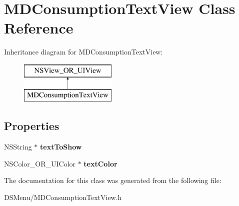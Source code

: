 \hypertarget{interface_m_d_consumption_text_view}{\section{M\-D\-Consumption\-Text\-View Class Reference}
\label{interface_m_d_consumption_text_view}
}
Inheritance diagram for M\-D\-Consumption\-Text\-View\-:\begin{figure}[H]
\begin{center}
\leavevmode
\includegraphics[height=2.000000cm]{interface_m_d_consumption_text_view}
\end{center}
\end{figure}
\subsection*{Properties}
\begin{DoxyCompactItemize}
\item 
\hypertarget{interface_m_d_consumption_text_view_a6add05e21d4bb0d81289fe1686aa8f38}{N\-S\-String $\ast$ {\bfseries text\-To\-Show}}\label{interface_m_d_consumption_text_view_a6add05e21d4bb0d81289fe1686aa8f38}

\item 
\hypertarget{interface_m_d_consumption_text_view_a121f27bbbd5fbf3d8508c5f271d92d98}{N\-S\-Color\-\_\-\-O\-R\-\_\-\-U\-I\-Color $\ast$ {\bfseries text\-Color}}\label{interface_m_d_consumption_text_view_a121f27bbbd5fbf3d8508c5f271d92d98}

\end{DoxyCompactItemize}


The documentation for this class was generated from the following file\-:\begin{DoxyCompactItemize}
\item 
D\-S\-Menu/M\-D\-Consumption\-Text\-View.\-h\end{DoxyCompactItemize}
